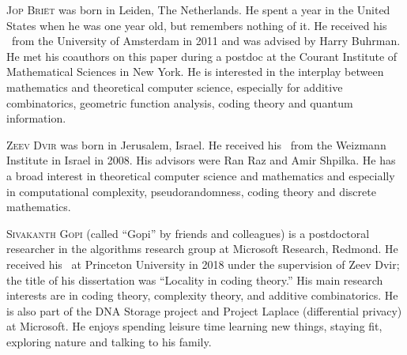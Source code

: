 \documentclass{toc}
\begin{document}
%
%
%
%
%
%
%
%
%
%
%
%
%
%
\begin{tocaboutauthors}
\begin{tocabout}[briet]  %
  \textsc{Jop Bri\"{e}t} was born in Leiden, The Netherlands. He spent a year in the United States when he was one year old, but remembers nothing of it. He received his \phd\ from the University of Amsterdam in 2011 and was  advised by Harry Buhrman.
He met his coauthors on this paper during a postdoc at the Courant Institute of Mathematical Sciences in New York.  
He is interested in the interplay between mathematics and theoretical computer science, especially for additive combinatorics, geometric function analysis, coding theory and quantum information.
  \end{tocabout}
\begin{tocabout}[dvir]
\textsc{Zeev Dvir} was born in Jerusalem, Israel. He received his \phd\ from the Weizmann Institute in Israel in 2008. His advisors were Ran Raz and Amir Shpilka. He has a broad interest in theoretical computer science and mathematics and especially in computational complexity, pseudorandomness, coding theory and discrete mathematics. 
\end{tocabout}  
\begin{tocabout}[gopi]
\textsc{Sivakanth Gopi}
(called ``Gopi'' by friends and colleagues)
is a postdoctoral researcher in the algorithms research group at
Microsoft Research, Redmond.
He received his \phd\ at Princeton University in 2018 under the supervision
of Zeev Dvir; the title of his dissertation was ``Locality in coding theory.''
His main research interests are in coding theory, complexity theory, and
additive combinatorics.  He is also part of the DNA Storage
project and Project Laplace (differential privacy) at Microsoft. 
He enjoys spending leisure time learning new things, staying fit,
exploring nature and talking to his family.
\end{tocabout}
\end{tocaboutauthors}
\end{document}
